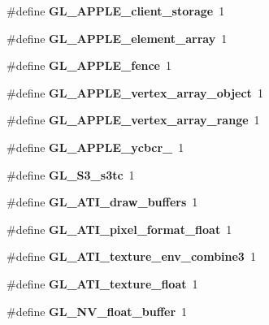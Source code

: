 \begin{DoxyCompactItemize}
\item 
\#define {\bfseries G\+L\+\_\+\+A\+P\+P\+L\+E\+\_\+client\+\_\+storage}~1\label{_s_d_l__opengl_8h_a538c64bc7f6553ffde6c0fd413f125e9}

\item 
\#define {\bfseries G\+L\+\_\+\+A\+P\+P\+L\+E\+\_\+element\+\_\+array}~1\label{_s_d_l__opengl_8h_a830e342340eac5136a0e01bf7f5f2cb7}

\item 
\#define {\bfseries G\+L\+\_\+\+A\+P\+P\+L\+E\+\_\+fence}~1\label{_s_d_l__opengl_8h_af823eb13dc84ed95c3b6ae442759a326}

\item 
\#define {\bfseries G\+L\+\_\+\+A\+P\+P\+L\+E\+\_\+vertex\+\_\+array\+\_\+object}~1\label{_s_d_l__opengl_8h_a248583f177c2a0e16a69e6b3d15f8a09}

\item 
\#define {\bfseries G\+L\+\_\+\+A\+P\+P\+L\+E\+\_\+vertex\+\_\+array\+\_\+range}~1\label{_s_d_l__opengl_8h_ac35be51fc9690b30beb3fc37b36031bc}

\item 
\#define {\bfseries G\+L\+\_\+\+A\+P\+P\+L\+E\+\_\+ycbcr\+\_}~1\label{_s_d_l__opengl_8h_aff4dbaa3accc951aa03e012669286809}

\item 
\#define {\bfseries G\+L\+\_\+\+S3\+\_\+s3tc}~1\label{_s_d_l__opengl_8h_a5425b82a8a9f4c3f70e6e242755703e9}

\item 
\#define {\bfseries G\+L\+\_\+\+A\+T\+I\+\_\+draw\+\_\+buffers}~1\label{_s_d_l__opengl_8h_a0a34680c4e877cf208976bcaee791a75}

\item 
\#define {\bfseries G\+L\+\_\+\+A\+T\+I\+\_\+pixel\+\_\+format\+\_\+float}~1\label{_s_d_l__opengl_8h_a32bb18545a154142e47cb4fbf91ff84b}

\item 
\#define {\bfseries G\+L\+\_\+\+A\+T\+I\+\_\+texture\+\_\+env\+\_\+combine3}~1\label{_s_d_l__opengl_8h_ad80154a2770c957074b204606df27d2f}

\item 
\#define {\bfseries G\+L\+\_\+\+A\+T\+I\+\_\+texture\+\_\+float}~1\label{_s_d_l__opengl_8h_a992c237aafe08a10244e79bab4ba8626}

\item 
\#define {\bfseries G\+L\+\_\+\+N\+V\+\_\+float\+\_\+buffer}~1\label{_s_d_l__opengl_8h_af5edc6684e70aa26a341e7614cb3ef37}


\end{DoxyCompactItemize}
